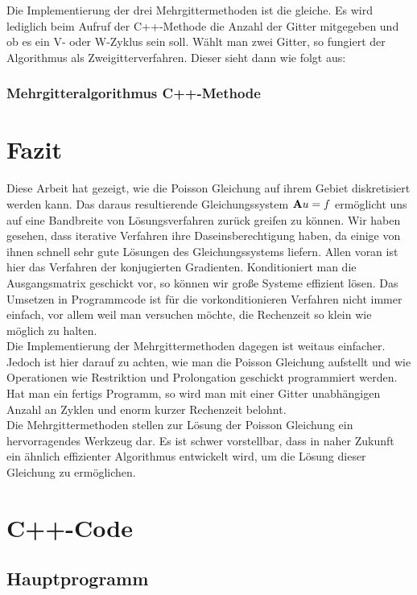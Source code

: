 Die Implementierung der drei Mehrgittermethoden ist die gleiche. Es wird lediglich beim Aufruf der C++-Methode die Anzahl der Gitter mitgegeben und ob es ein V- oder W-Zyklus sein soll. Wählt man zwei Gitter, so fungiert der Algorithmus als Zweigitterverfahren. Dieser sieht dann wie folgt aus:

\subsection{Mehrgitteralgorithmus C++-Methode}\label{s.mgm}

\chapter{Fazit}

Diese Arbeit hat gezeigt, wie die Poisson Gleichung auf ihrem Gebiet diskretisiert werden kann. Das daraus resultierende Gleichungssystem ${\textbf{A}} u = f$ ermöglicht uns auf eine Bandbreite von Lösungsverfahren zurück greifen zu können. Wir haben gesehen, dass iterative Verfahren ihre Daseinsberechtigung haben, da einige von ihnen schnell sehr gute Lösungen des Gleichungssystems liefern. Allen voran ist hier das Verfahren der konjugierten Gradienten. Konditioniert man die Ausgangsmatrix geschickt vor, so können wir große Systeme effizient lösen. Das Umsetzen in Programmcode ist für die vorkonditionieren Verfahren nicht immer einfach, vor allem weil man versuchen möchte, die Rechenzeit so klein wie möglich zu halten.\\
Die Implementierung der Mehrgittermethoden dagegen ist weitaus einfacher. Jedoch ist hier darauf zu achten, wie man die Poisson Gleichung aufstellt und wie Operationen wie Restriktion und Prolongation geschickt programmiert werden. Hat man ein fertigs Programm, so wird man mit einer Gitter unabhängigen Anzahl an Zyklen und enorm kurzer Rechenzeit belohnt.\\
Die Mehrgittermethoden stellen zur Lösung der Poisson Gleichung ein hervorragendes Werkzeug dar. Es ist schwer vorstellbar, dass in naher Zukunft ein ähnlich effizienter Algorithmus entwickelt wird, um die Lösung dieser Gleichung zu ermöglichen.

\chapter{C++-Code}
\section{Hauptprogramm}
